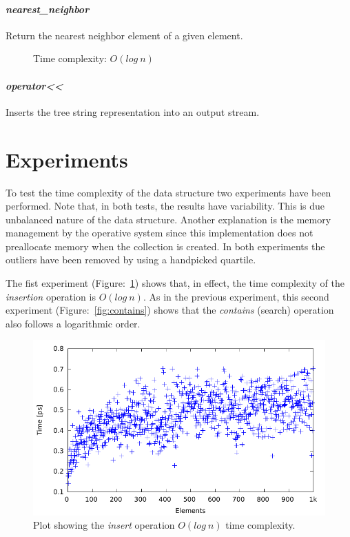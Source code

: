 \documentclass{article}
\begin{document}
\paragraph*{\textit{nearest\_neighbor}} Return the nearest neighbor element of a given element.
\begin{description}
\item[] Time complexity: $O(log~n)$ 
\end{description}

\paragraph*{\textit{operator\textless\textless}} Inserts the tree string representation into an output stream.

\section*{Experiments}
To test the time complexity of the data structure two experiments have been performed. Note that, in both tests, the results have variability. This is due unbalanced nature of the data structure. Another explanation is the memory management by the operative system since this implementation does not preallocate memory when the collection is created. In both experiments the outliers have been removed by using a handpicked quartile.

The fist experiment (Figure:~\ref{fig:insert}) shows that, in effect, the time complexity of the \textit{insertion} operation is $O(log~n)$. As in the previous experiment, this second experiment (Figure:~\ref{fig:contains}) shows that the  \textit{contains} (search) operation also follows a logarithmic order.

\begin{figure}
\centering
\includegraphics[width=\linewidth]{insert_outlayers.pdf}
\caption{Plot showing the \textit{insert} operation $O(log~n)$ time complexity.}
\label{fig:insert}
\end{figure}
\end{document}
